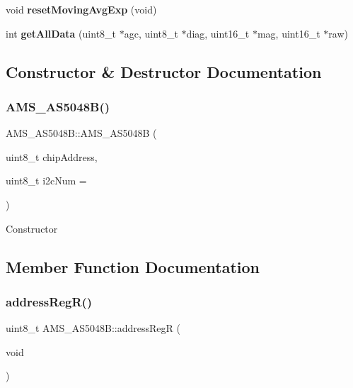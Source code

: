 \begin{DoxyCompactItemize}
\mbox{\label{classAMS__AS5048B_ac4b8db2e8d36e45d894812aa799cd89e}} 
void {\bfseries reset\+Moving\+Avg\+Exp} (void)
\item 
\mbox{\label{classAMS__AS5048B_a642b24b2211ad4c4e4787f752ddfa65c}} 
int {\bfseries get\+All\+Data} (uint8\+\_\+t $\ast$agc, uint8\+\_\+t $\ast$diag, uint16\+\_\+t $\ast$mag, uint16\+\_\+t $\ast$raw)
\end{DoxyCompactItemize}


\subsection{Constructor \& Destructor Documentation}
\mbox{\label{classAMS__AS5048B_af3749e3b6d8b1a4eb755f56581aeacdc}} 
\subsubsection{\texorpdfstring{A\+M\+S\+\_\+\+A\+S5048\+B()}{AMS\_AS5048B()}}
{\footnotesize\ttfamily A\+M\+S\+\_\+\+A\+S5048\+B\+::\+A\+M\+S\+\_\+\+A\+S5048B (\begin{DoxyParamCaption}\item[{uint8\+\_\+t}]{chip\+Address,  }\item[{uint8\+\_\+t}]{i2c\+Num = {} }\end{DoxyParamCaption})}

Constructor 

\subsection{Member Function Documentation}
\mbox{\label{classAMS__AS5048B_a02b3c3054c8cca8c3d8167b835794ff6}} 
\subsubsection{\texorpdfstring{address\+Reg\+R()}{addressRegR()}}
{\footnotesize\ttfamily uint8\+\_\+t A\+M\+S\+\_\+\+A\+S5048\+B\+::address\+RegR (\begin{DoxyParamCaption}\item[{void}]{ }\end{DoxyParamCaption})}



